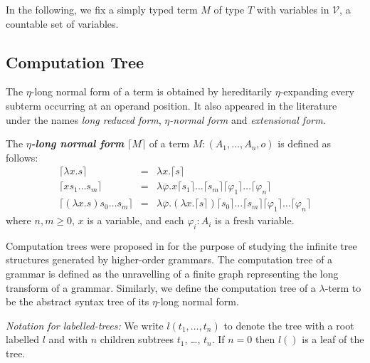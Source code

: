 \documentclass{llncs}
\newcommand\defname[1]{{\bf\em #1}\index{#1}}
\newcommand\aux[1]{\lceil #1\rceil}
\begin{document}
In the following, we fix a simply typed term $M$ of type $T$ with variables in $\mathcal{V}$, a countable set of variables.
\subsection{Computation Tree}

The $\eta$-long normal form of a term is obtained by hereditarily $\eta$-expanding every
subterm occurring at an operand position.
It also appeared in the literature \cite{DBLP:journals/tcs/JensenP76,DBLP:journals/tcs/Huet75,huet76} under the names \emph{long reduced form}, \emph{$\eta$-normal form} and \emph{extensional form}.

\begin{definition}
The \defname{$\eta$-long normal form} $\aux{M}$ of a term $M: (A_1,\ldots,A_n,o)$ is defined as follows:
\begin{eqnarray*}
\aux{\lambda x . s } &=& \lambda x . \aux{s} \\
\aux{x s_1 \ldots s_m } &=& \lambda \overline{\varphi} . x \aux{s_1}\ldots \aux{s_m} \aux{\varphi_1} \ldots \aux{\varphi_n} \\
\aux{(\lambda x . s) s_0 \ldots s_m } &=& \lambda \overline{\varphi} . (\lambda x . \aux{s}) \aux{s_0} \ldots \aux{s_m} \aux{\varphi_1} \ldots \aux{\varphi_n}
\end{eqnarray*}
where $n,m \geq 0$, $x$ is a  variable, and each $\varphi_i : A_i$ is a fresh variable.
\end{definition}


Computation trees were proposed in \cite{OngLics2006} for the purpose of studying the infinite tree structures generated by higher-order grammars. The computation tree of a grammar is defined as the unravelling of a finite graph representing the long transform of a grammar. Similarly, we define the computation tree of a $\lambda$-term to be the abstract syntax tree of its $\eta$-long normal form.

\emph{Notation for labelled-trees:} We write $l(t_1, \ldots, t_n)$ to denote the tree with a root labelled $l$ and with $n$ children subtrees $t_1$, \ldots, $t_n$. If $n=0$ then $l()$ is a leaf of the tree.
\end{document}
